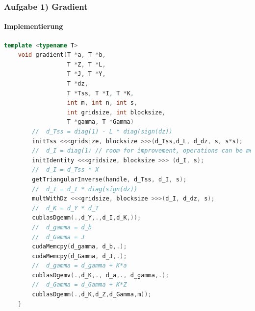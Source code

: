 \begin{frame}[fragile]
	\frametitle{Aufgabe 1) Gradient}
	\framesubtitle{Implementierung}
	\begin{lstlisting}[language=cpp]
	template <typename T>
	void gradient(T *a, T *b, 
				  T *Z, T *L, 
				  T *J, T *Y,
				  T *dz,
				  T *Tss, T *I, T *K,
				  int m, int n, int s,
				  int gridsize, int blocksize,
				  T *gamma, T *Gamma)
		//  d_Tss = diag(1) - L * diag(sign(dz))
		initTss <<<gridsize, blocksize >>>(d_Tss,d_L, d_dz, s, s*s);
		//  d_I = diag(1) // room for improvement, operations can be merged		
		initIdentity <<<gridsize, blocksize >>> (d_I, s);
		//  d_I = d_Tss * X	
		getTriangularInverse(handle, d_Tss, d_I, s);
		//	d_I = d_I * diag(sign(dz))
		multWithDz <<<gridsize, blocksize >>>(d_I, d_dz, s);
		//	d_K = d_Y * d_I
		cublasDgemm(.,d_Y,.,d_I,d_K,));
		//	d_gamma = d_b
		//  d_Gamma = J
		cudaMemcpy(d_gamma, d_b,.);
		cudaMemcpy(d_Gamma, d_J,.);
		//	d_gamma = d_gamma + K*a
		cublasDgemv(.,d_K,., d_a,., d_gamma,.);
		//  d_Gamma = d_Gamma + K*Z
		cublasDgemm(.,d_K,d_Z,d_Gamma,m));
	}
	\end{lstlisting}
\end{frame}

